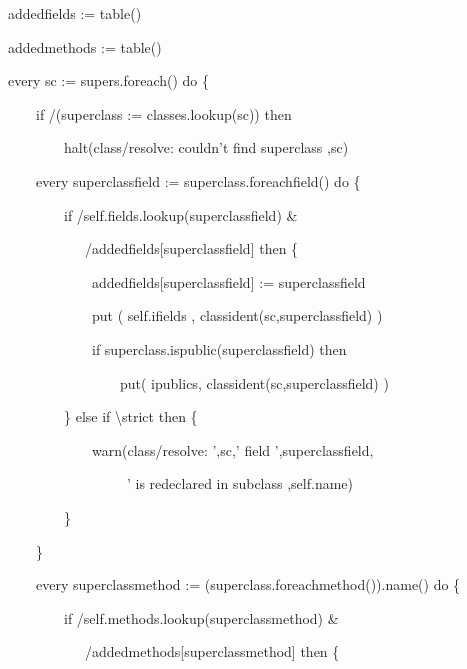 {\ttfamily\mdseries
\ \ \ \ addedfields := table()}

{\ttfamily\mdseries
\ \ \ \ addedmethods := table()}

{\ttfamily\mdseries
\ \ \ \ every sc := supers.foreach() do \{}

{\ttfamily\mdseries
\ \ \ \ \ \ \ \ if /(superclass := classes.lookup(sc)) then}

{\ttfamily\mdseries
\ \ \ \ \ \ \ \ \ \ \ \ halt({\textquotedbl}class/resolve: couldn't find superclass {\textquotedbl},sc)}

{\ttfamily\mdseries
\ \ \ \ \ \ \ \ every superclassfield := superclass.foreachfield() do \{}

{\ttfamily\mdseries
\ \ \ \ \ \ \ \ \ \ \ \ if /self.fields.lookup(superclassfield) \&}

{\ttfamily\mdseries
\ \ \ \ \ \ \ \ \ \ \ \ \ \ \ /addedfields[superclassfield] then \{}

{\ttfamily\mdseries
\ \ \ \ \ \ \ \ \ \ \ \ \ \ \ \ addedfields[superclassfield] := superclassfield}

{\ttfamily\mdseries
\ \ \ \ \ \ \ \ \ \ \ \ \ \ \ \ put ( self.ifields , classident(sc,superclassfield) )}

{\ttfamily\mdseries
\ \ \ \ \ \ \ \ \ \ \ \ \ \ \ \ if superclass.ispublic(superclassfield) then}

{\ttfamily\mdseries
\ \ \ \ \ \ \ \ \ \ \ \ \ \ \ \ \ \ \ \ put( ipublics, classident(sc,superclassfield) )}

{\ttfamily\mdseries
\ \ \ \ \ \ \ \ \ \ \ \ \} else if {\textbackslash}strict then \{}

{\ttfamily\mdseries
\ \ \ \ \ \ \ \ \ \ \ \ \ \ \ \ warn({\textquotedbl}class/resolve: '{\textquotedbl},sc,{\textquotedbl}' field
'{\textquotedbl},superclassfield,}

{\ttfamily\mdseries
\ \ \ \ \ \ \ \ \ \ \ \ \ \ \ \ \ \ \ \ \ {\textquotedbl}' is redeclared in subclass {\textquotedbl},self.name)}

{\ttfamily\mdseries
\ \ \ \ \ \ \ \ \ \ \ \ \}}

{\ttfamily\mdseries
\ \ \ \ \ \ \ \ \}}

{\ttfamily\mdseries
\ \ \ \ \ \ \ \ every superclassmethod := (superclass.foreachmethod()).name() do \{}

{\ttfamily\mdseries
\ \ \ \ \ \ \ \ \ \ \ \ if /self.methods.lookup(superclassmethod) \&}

{\ttfamily\mdseries
\ \ \ \ \ \ \ \ \ \ \ \ \ \ \ /addedmethods[superclassmethod] then \{}

